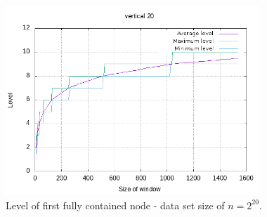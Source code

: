 \begin{figure}[h]
    \centering
    \includegraphics[width = 0.85\textwidth]{pictures/analysis/level_vert_20.png}
    \caption{Level of first fully contained node - data set size of $n=2^{20}$.}\label{fig:level_vert_20}
\end{figure}


